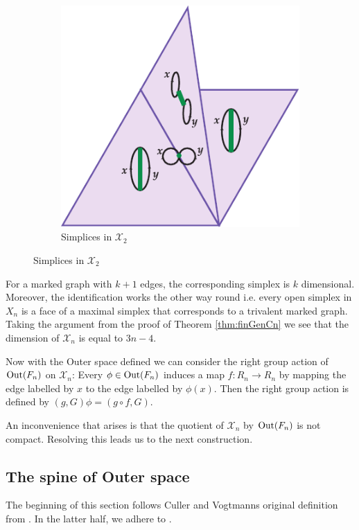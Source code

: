 \begin{figure}[h]
\begin{subfigure}{0.3\textwidth}
		\includegraphics[width=\textwidth]{./Images/outerSpaceFaces.pdf}
		\caption{Simplices in $\mathcal{X}_{2}$}
	\end{subfigure}
\end{figure}

For a marked graph with $k+1$ edges, the corresponding simplex is $k$ dimensional.
Moreover, the identification works the other way round i.e. every open simplex in $X_{n}$ 
is a face of a maximal simplex that corresponds to a trivalent marked graph.
Taking the argument from the proof of Theorem \ref{thm:finGenCn} we see that the dimension of $\mathcal{X}_{n}$ is equal to $3n -4$.

Now with the Outer space defined we can consider the right group action of $\operatorname{Out}(F_{n})$ on $\mathcal{X}_{n}$:
Every $\phi \in \operatorname{Out}(F_{n})$ induces a map $f: R_{n} \to R_{n}$ by mapping the edge labelled
by $x$ to the edge labelled by $\phi(x)$.
Then the right group action is defined by $(g,G) \phi = (g \circ f, G)$.

An inconvenience that arises is that the quotient of $\mathcal{X}_{n}$ by $\operatorname{Out}(F_{n})$ is not compact.
Resolving this leads us to the next construction.

\subsection{The spine of Outer space}
The beginning of this section follows Culler and Vogtmanns original definition from \cite{vogtmann86}.
In the latter half, we adhere to \cite{vogtmann16}.

